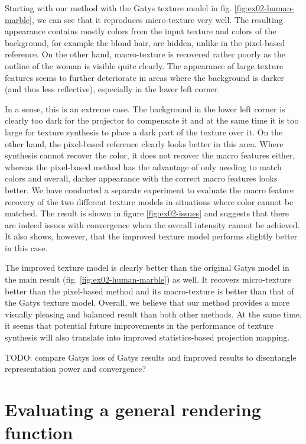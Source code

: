 Starting with our method with the Gatys texture model in fig. \ref{fig:ex02-human-marble}, we can see that it reproduces micro-texture very well. The resulting appearance contains mostly colors from the input texture and colors of the background, for example the blond hair, are hidden, unlike in the pixel-based reference. On the other hand, macro-texture is recovered rather poorly as the outline of the woman is visible quite clearly. The appearance of large texture features seems to further deteriorate in areas where the background is darker (and thus less reflective), especially in the lower left corner.

In a sense, this is an extreme case. The background in the lower left corner is clearly too dark for the projector to compensate it and at the same time it is too large for texture synthesis to place a dark part of the texture over it. On the other hand, the pixel-based reference clearly looks better in this area. Where synthesis cannot recover the color, it does not recover the macro features either, whereas the pixel-based method has the advantage of only needing to match colors and overall, darker appearance with the correct macro features looks better. We have conducted a separate experiment to evaluate the macro feature recovery of the two different texture models in situations where color cannot be matched. The result is shown in figure \ref{fig:ex02-issues} and suggests that there are indeed issues with convergence when the overall intensity cannot be achieved. It also shows, however, that the improved texture model performs slightly better in this case.

The improved texture model is clearly better than the original Gatys model in the main result (fig. \ref{fig:ex02-human-marble}) as well. It recovers micro-texture better than the pixel-based method and its macro-texture is better than that of the Gatys texture model. Overall, we believe that our method provides a more visually pleasing and balanced result than both other methods. At the same time, it seems that potential future improvements in the performance of texture synthesis will also translate into improved statistics-based projection mapping.

{\color{red} TODO: compare Gatys loss of Gatys results and improved results to disentangle representation power and convergence?}

\section{Evaluating a general rendering function}
\label{section:results-experiments-03}

